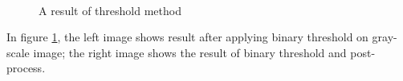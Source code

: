 \begin{figure}[h]
	\centering
	~~
	\caption{A result of threshold method}
	\label{figthreshold}
\end{figure}
In figure \ref{figthreshold}, the left image shows result after applying binary threshold on gray-scale image; the right image shows the result of binary threshold and post-process. 
